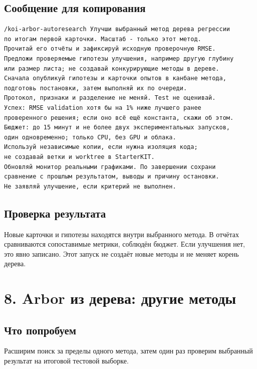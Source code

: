 \documentclass[10pt,a4paper]{article}
\begin{document}
\subsection*{Сообщение для копирования}
\begin{promptbox}
\begin{Verbatim}
/koi-arbor-autoresearch Улучши выбранный метод дерева регрессии
по итогам первой карточки. Масштаб - только этот метод.
Прочитай его отчёты и зафиксируй исходную проверочную RMSE.
Предложи проверяемые гипотезы улучшения, например другую глубину
или размер листа; не создавай конкурирующие методы в дереве.
Сначала опубликуй гипотезы и карточки опытов в канбане метода,
подготовь постановки, затем выполняй их по очереди.
Протокол, признаки и разделение не меняй. Test не оценивай.
Успех: RMSE validation хотя бы на 1% ниже лучшего ранее
проверенного решения; если оно всё ещё константа, скажи об этом.
Бюджет: до 15 минут и не более двух экспериментальных запусков,
один одновременно; только CPU, без GPU и облака.
Используй независимые копии, если нужна изоляция кода;
не создавай ветки и worktree в StarterKIT.
Обновляй монитор реальными графиками. По завершении сохрани
сравнение с прошлым результатом, выводы и причину остановки.
Не заявляй улучшение, если критерий не выполнен.
\end{Verbatim}
\end{promptbox}
\subsection*{Проверка результата}
Новые карточки и гипотезы находятся внутри выбранного метода. В отчётах сравниваются сопоставимые метрики, соблюдён бюджет. Если улучшения нет, это явно записано. Этот запуск не создаёт новые методы и не меняет корень дерева.


\clearpage
\section{8. Arbor из дерева: другие методы}
\subsection*{Что попробуем}
Расширим поиск за пределы одного метода, затем один раз проверим выбранный результат на итоговой тестовой выборке.
\end{document}
